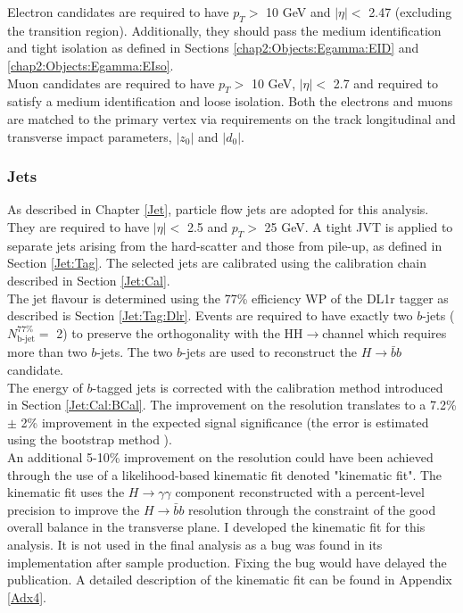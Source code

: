 Electron candidates are required to have $p_T > $ 10 GeV and $|\eta| < $ 2.47 (excluding the transition region). Additionally, they should pass the medium identification and tight isolation as defined in Sections \ref{chap2:Objects:Egamma:EID} and \ref{chap2:Objects:Egamma:EIso}. \\
Muon candidates are required to have $p_T > $ 10 GeV, $|\eta| < $ 2.7 and required to satisfy a medium identification and loose isolation. Both the electrons and muons are matched to the primary vertex via requirements on the track longitudinal and transverse impact parameters, $|z_0|$ and $|d_0|$.

\subsubsection{Jets}
\label{HHyybb:ObjEvt:Obj:Jet}
As described in Chapter \ref{Jet}, particle flow jets are adopted for this analysis. They are required to have $|\eta| < $ 2.5 and $p_T > $ 25 GeV. A tight JVT is applied to separate jets arising from the hard-scatter and those from pile-up, as defined in Section \ref{Jet:Tag}. The selected jets are calibrated using the calibration chain described in Section \ref{Jet:Cal}. \\
The jet flavour is determined using the 77\% efficiency WP of the DL1r tagger as described is Section \ref{Jet:Tag:Dlr}. Events are required to have exactly two $b$-jets ($N_{\text{b-jet}}^{77\%} = $ 2) to preserve the orthogonality with the HH$\to$\bbbb channel which requires more than two $b$-jets. The two $b$-jets are used to reconstruct the $H\to\bar{b}b$ candidate. \\
The energy of $b$-tagged jets is corrected with the calibration method introduced in Section \ref{Jet:Cal:BCal}. The improvement on the \mbb resolution translates to a 7.2\% $\pm$ 2\% improvement in the expected signal significance (the error is estimated using the bootstrap method \cite{Bootstrap}). \\

An additional 5-10\% improvement on the \mbb resolution could have been achieved through the use of a likelihood-based kinematic fit denoted "kinematic fit". The kinematic fit uses the $H\to\gamma\gamma$ component reconstructed with a percent-level precision to improve the $H\to\bar{b}b$ resolution through the constraint of the good overall balance in the transverse plane. I developed the kinematic fit for this \HHyybb analysis. It is not used in the final analysis as a bug was found in its implementation after sample production. Fixing the bug would have delayed the publication. A detailed description of the kinematic fit can be found in Appendix \ref{Adx4}. \\

